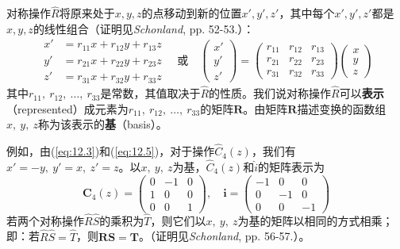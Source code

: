     对称操作$\hat{R}$将原来处于$x,y,z$的点移动到新的位置$x',y',z'$，其中每个$x',y',z'$都是$x,y,z$的线性组合（证明见\textit{Schonland}, pp. 52-53.）：
    \begin{equation*}
        \begin{aligned}
            x' &= r_{11}x + r_{12}y + r_{13}z \\
            y' &= r_{21}x + r_{22}y + r_{23}z \\
            z' &= r_{31}x + r_{32}y + r_{33}z
        \end{aligned} \quad \text{或} \quad
        \begin{pmatrix}
            x' \\
            y' \\
            z'
        \end{pmatrix}
        =\begin{pmatrix}
            r_{11} & r_{12} & r_{13} \\
            r_{21} & r_{22} & r_{23} \\
            r_{31} & r_{32} & r_{33}
        \end{pmatrix}\begin{pmatrix}
            x \\
            y \\
            z
        \end{pmatrix}
    \end{equation*}
    其中$r_{11},\:r_{12},\:\ldots,\:r_{33}$是常数，其值取决于$\hat{R}$的性质。我们说对称操作$\hat{R}$可以\textbf{表示}（represented）成元素为$r_{11},\:r_{12},\:\ldots,\:r_{33}$的矩阵$\mathbf{R}$。由矩阵$\mathbf{R}$描述变换的函数组$x,\:y,\:z$称为该表示的\textbf{基}（basis）。

    例如，由(\ref{eq:12.3})和(\ref{eq:12.5})，对于操作$\hat{C}_4\left(z\right)$，我们有$x' = -y,\: y' = x,\: z' = z$。以$x,\:y,\:z$为基，$\hat{C}_4\left(z\right)$和$\hat{i}$的矩阵表示为
    \begin{equation*}
        \mathbf{C}_4\left(z\right) = \begin{pmatrix}
            0 & -1 & 0 \\
            1 & 0 & 0 \\
            0 & 0 & 1
        \end{pmatrix}, \quad \mathbf{i} = \begin{pmatrix}
            -1 & 0 & 0 \\
            0 & -1 & 0 \\
            0 & 0 & -1
        \end{pmatrix}
    \end{equation*}
    若两个对称操作$\hat{R}\hat{S}$的乘积为$\hat{T}$，则它们以$x,\:y,\:z$为基的矩阵以相同的方式相乘；即：若$\hat{R}\hat{S} = \hat{T}$，则$\mathbf{R}\mathbf{S} = \mathbf{T}$。（证明见\textit{Schonland}, pp. 56-57.）。

